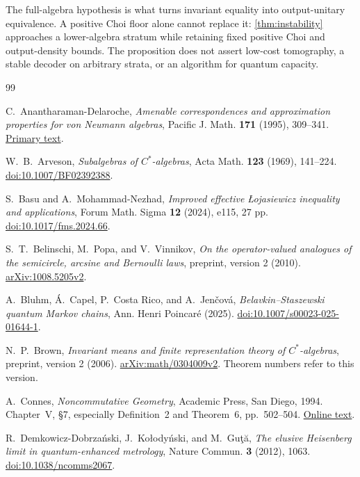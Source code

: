 \documentclass[11pt,reqno]{amsart}
\theoremstyle{definition}
\theoremstyle{remark}
\numberwithin{equation}{section}
\begin{document}
The full-algebra hypothesis is what turns invariant equality into output-unitary equivalence. A positive Choi floor alone cannot replace it: \cref{thm:instability} approaches a lower-algebra stratum while retaining fixed positive Choi and output-density bounds. The proposition does not assert low-cost tomography, a stable decoder on arbitrary strata, or an algorithm for quantum capacity.



\begin{thebibliography}{99}
\raggedright

C.~Anantharaman-Delaroche,
\emph{Amenable correspondences and approximation properties for von Neumann algebras},
Pacific J. Math. \textbf{171} (1995), 309--341.
\href{https://msp.org/pjm/1995/171-2/pjm-v171-n2-p02-s.pdf}{Primary text}.

W.~B.~Arveson,
\emph{Subalgebras of $C^*$-algebras},
Acta Math. \textbf{123} (1969), 141--224.
\href{https://doi.org/10.1007/BF02392388}{doi:10.1007/BF02392388}.

S.~Basu and A.~Mohammad-Nezhad,
\emph{Improved effective \L ojasiewicz inequality and applications},
Forum Math. Sigma \textbf{12} (2024), e115, 27 pp.
\href{https://doi.org/10.1017/fms.2024.66}{doi:10.1017/fms.2024.66}.

S.~T.~Belinschi, M.~Popa, and V.~Vinnikov,
\emph{On the operator-valued analogues of the semicircle, arcsine and Bernoulli laws},
preprint, version 2 (2010).
\href{https://arxiv.org/abs/1008.5205v2}{arXiv:1008.5205v2}.

A.~Bluhm, \'A.~Capel, P.~Costa Rico, and A.~Jen\v cov\'a,
\emph{Belavkin--Staszewski quantum Markov chains},
Ann. Henri Poincar\'e (2025).
\href{https://doi.org/10.1007/s00023-025-01644-1}{doi:10.1007/s00023-025-01644-1}.

N.~P.~Brown,
\emph{Invariant means and finite representation theory of $C^*$-algebras},
preprint, version 2 (2006).
\href{https://arxiv.org/abs/math/0304009v2}{arXiv:math/0304009v2}.
Theorem numbers refer to this version.

A.~Connes,
\emph{Noncommutative Geometry}, Academic Press, San Diego, 1994.
Chapter~V, \S7, especially Definition~2 and Theorem~6, pp.~502--504.
\href{https://webhomes.maths.ed.ac.uk/~v1ranick/papers/connes.pdf}{Online text}.

R.~Demkowicz-Dobrza\'nski, J.~Ko\l ody\'nski, and M.~Gu\c t\u a,
\emph{The elusive Heisenberg limit in quantum-enhanced metrology},
Nature Commun. \textbf{3} (2012), 1063.
\href{https://doi.org/10.1038/ncomms2067}{doi:10.1038/ncomms2067}.


\end{thebibliography}
\end{document}
